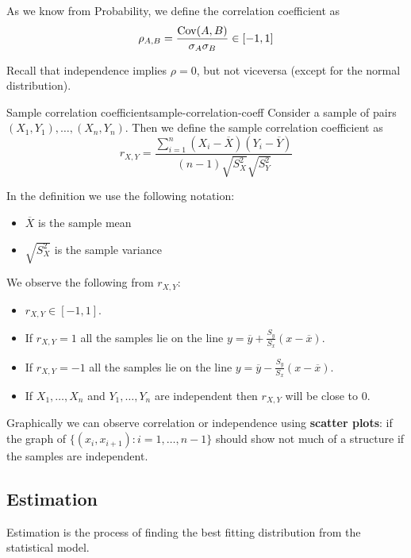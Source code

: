 \documentclass[12pt]{extarticle}
\newcommand{\cov}{{\operatorfont Cov}}
\begin{document}
As we know from Probability, we define the correlation coefficient as
\begin{equation}
    \rho_{A,B} = \frac{\cov(A, B)}{\sigma_A \sigma_B} \in [-1, 1]
\end{equation}

Recall that independence implies $\rho = 0$, but not viceversa (except for the normal distribution).

\begin{definition}{Sample correlation coefficient}{sample-correlation-coeff}
    Consider a sample of pairs $(X_1, Y_1), \dots, (X_n, Y_n)$.
    Then we define the sample correlation coefficient as
    \begin{equation}
        r_{X, Y} = \frac{\sum^n_{i = 1} (X_i - \overline{X})(Y_i - \overline{Y})}{(n-1)\sqrt{S^2_X} \sqrt{S^2_Y}}
    \end{equation}
\end{definition}

In the definition we use the following notation:
\begin{itemize}
    \item $\overline X$ is the sample mean
    \item $\sqrt{S^2_X}$ is the sample variance
\end{itemize}

We observe the following from $r_{X, Y}$:
\begin{itemize}
    \item $r_{X, Y} \in [-1, 1]$.
    \item If $r_{X, Y} = 1$ all the samples lie on the line $y = \overline y + \frac{S_y}{S_x}(x-\overline x)$.
    \item If $r_{X, Y} = -1$ all the samples lie on the line $y = \overline y - \frac{S_y}{S_x}(x-\overline x)$.
    \item If $X_1, \dots, X_n$ and $Y_1, \dots, Y_n$ are independent then $r_{X, Y}$ will be close to $0$.
\end{itemize}

Graphically we can observe correlation or independence using \textbf{scatter plots}: if the graph of $\{ (x_i, x_{i+1}) : i = 1, \dots, n-1 \}$ should show not much of a structure if the samples are independent.

\subsection{Estimation}

Estimation is the process of finding the best fitting distribution from the statistical model.
\end{document}
